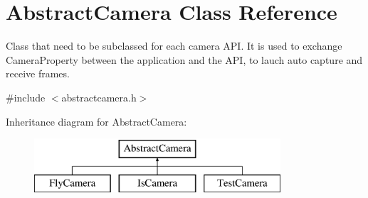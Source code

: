 \hypertarget{class_abstract_camera}{\section{Abstract\-Camera Class Reference}
\label{class_abstract_camera}
}


Class that need to be subclassed for each camera A\-P\-I. It is used to exchange Camera\-Property between the application and the A\-P\-I, to lauch auto capture and receive frames.  




{\ttfamily \#include $<$abstractcamera.\-h$>$}

Inheritance diagram for Abstract\-Camera\-:\begin{figure}[H]
\begin{center}
\leavevmode
\includegraphics[height=2.000000cm]{class_abstract_camera}
\end{center}
\end{figure}
